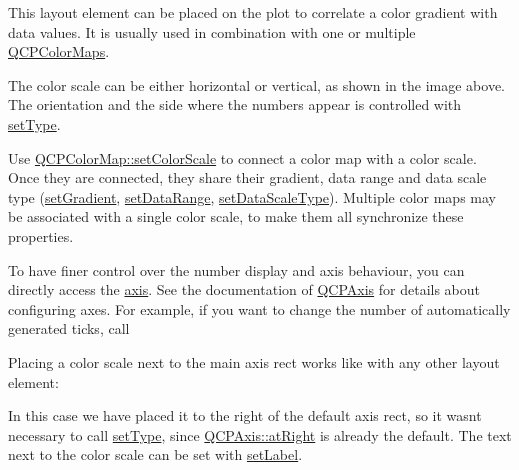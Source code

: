 This layout element can be placed on the plot to correlate a color gradient with data values. It is usually used in combination with one or multiple \hyperlink{class_q_c_p_color_map}{Q\+C\+P\+Color\+Maps}.



The color scale can be either horizontal or vertical, as shown in the image above. The orientation and the side where the numbers appear is controlled with \hyperlink{class_q_c_p_color_scale_a1bf9bdb291927c422dd66b404b206f1f}{set\+Type}.

Use \hyperlink{class_q_c_p_color_map_aa828921db364fe3c6af4619580ab85fd}{Q\+C\+P\+Color\+Map\+::set\+Color\+Scale} to connect a color map with a color scale. Once they are connected, they share their gradient, data range and data scale type (\hyperlink{class_q_c_p_color_scale_a1f29583bb6f1e7f473b62fb712be3940}{set\+Gradient}, \hyperlink{class_q_c_p_color_scale_abe88633003a26d1e756aa74984587fef}{set\+Data\+Range}, \hyperlink{class_q_c_p_color_scale_aeb6107d67dd7325145b2498abae67fc3}{set\+Data\+Scale\+Type}). Multiple color maps may be associated with a single color scale, to make them all synchronize these properties.

To have finer control over the number display and axis behaviour, you can directly access the \hyperlink{class_q_c_p_color_scale_a39bdbdb3b212602a5a57f9f3ea444190}{axis}. See the documentation of \hyperlink{class_q_c_p_axis}{Q\+C\+P\+Axis} for details about configuring axes. For example, if you want to change the number of automatically generated ticks, call 
\begin{DoxyCodeInclude}
\end{DoxyCodeInclude}
 Placing a color scale next to the main axis rect works like with any other layout element\+: 
\begin{DoxyCodeInclude}
\end{DoxyCodeInclude}
In this case we have placed it to the right of the default axis rect, so it wasn\textquotesingle{}t necessary to call \hyperlink{class_q_c_p_color_scale_a1bf9bdb291927c422dd66b404b206f1f}{set\+Type}, since \hyperlink{class_q_c_p_axis_ae2bcc1728b382f10f064612b368bc18aadf5509f7d29199ef2f263b1dd224b345}{Q\+C\+P\+Axis\+::at\+Right} is already the default. The text next to the color scale can be set with \hyperlink{class_q_c_p_color_scale_aee124ae8396320cacf8276e9a0fbb8ce}{set\+Label}.


